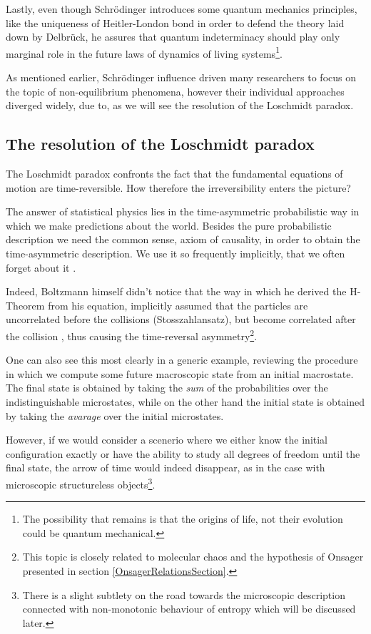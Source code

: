 \documentclass[a4paper,12pt]{article}
\begin{document}
Lastly, even though Schrödinger introduces some quantum mechanics principles, like the uniqueness of Heitler-London bond in order to defend the theory laid down by Delbrück, he assures that quantum indeterminacy should play only marginal role in the future laws of dynamics of living systems\footnote{The possibility that remains is that the origins of life, not their evolution could be quantum mechanical.}.

As mentioned earlier, Schrödinger influence driven many researchers to focus on the topic of non-equilibrium phenomena, however their individual approaches diverged widely, due to, as we will see the resolution of the Loschmidt paradox.

\subsection{The resolution of the Loschmidt paradox }

The Loschmidt paradox confronts the fact that the fundamental equations of motion are time-reversible. How therefore the irreversibility enters the picture?

The answer of statistical physics lies in the time-asymmetric probabilistic way in which we make predictions about the world. 
Besides the pure probabilistic description we need the common sense, axiom of causality, in order to obtain the time-asymmetric description.
We use it so frequently implicitly, that we often forget about it \cite{Evans:2241458}. 

Indeed, Boltzmann himself didn't notice that the way in which he derived the H-Theorem from his equation, implicitly assumed that the particles are uncorrelated before the collisions (Stosszahlansatz), but become correlated after the collision \cite{Schwabl:2002, Dorfman:ozm67-zD}, thus causing the time-reversal asymmetry\footnote{This topic is closely related to molecular chaos and the hypothesis of Onsager presented in section \ref{OnsagerRelationsSection}.}.

One can also see this most clearly in a generic example, reviewing the procedure in which we compute some future macroscopic state from an initial macrostate. The final state is obtained by taking the \textit{sum} of the probabilities over the indistinguishable microstates, while on the other hand the initial state is obtained by taking the \textit{avarage} over the initial microstates.

However, if we would consider a scenerio where we either know the initial configuration exactly or have the ability to study all degrees of freedom until the final state, the arrow of time would indeed disappear, as in the case with microscopic structureless objects\footnote{There is a slight subtlety on the road towards the microscopic description connected with non-monotonic behaviour of entropy which will be discussed later.}.
\end{document}
